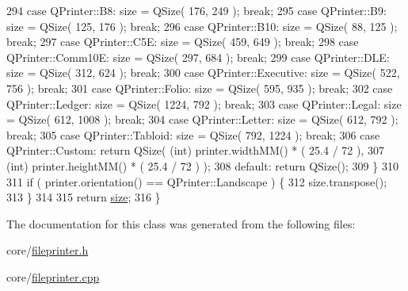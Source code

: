 \begin{DoxyCode}
294     \textcolor{keywordflow}{case} QPrinter::B8:        size = QSize(  176,  249 ); \textcolor{keywordflow}{break};
295     \textcolor{keywordflow}{case} QPrinter::B9:        size = QSize(  125,  176 ); \textcolor{keywordflow}{break};
296     \textcolor{keywordflow}{case} QPrinter::B10:       size = QSize(   88,  125 ); \textcolor{keywordflow}{break};
297     \textcolor{keywordflow}{case} QPrinter::C5E:       size = QSize(  459,  649 ); \textcolor{keywordflow}{break};
298     \textcolor{keywordflow}{case} QPrinter::Comm10E:   size = QSize(  297,  684 ); \textcolor{keywordflow}{break};
299     \textcolor{keywordflow}{case} QPrinter::DLE:       size = QSize(  312,  624 ); \textcolor{keywordflow}{break};
300     \textcolor{keywordflow}{case} QPrinter::Executive: size = QSize(  522,  756 ); \textcolor{keywordflow}{break};
301     \textcolor{keywordflow}{case} QPrinter::Folio:     size = QSize(  595,  935 ); \textcolor{keywordflow}{break};
302     \textcolor{keywordflow}{case} QPrinter::Ledger:    size = QSize( 1224,  792 ); \textcolor{keywordflow}{break};
303     \textcolor{keywordflow}{case} QPrinter::Legal:     size = QSize(  612, 1008 ); \textcolor{keywordflow}{break};
304     \textcolor{keywordflow}{case} QPrinter::Letter:    size = QSize(  612,  792 ); \textcolor{keywordflow}{break};
305     \textcolor{keywordflow}{case} QPrinter::Tabloid:   size = QSize(  792, 1224 ); \textcolor{keywordflow}{break};
306     \textcolor{keywordflow}{case} QPrinter::Custom:    \textcolor{keywordflow}{return} QSize( (\textcolor{keywordtype}{int}) printer.widthMM() * ( 25.4 / 72 ),
307                                             (\textcolor{keywordtype}{int}) printer.heightMM() * ( 25.4 / 72 ) );
308     \textcolor{keywordflow}{default}:                  \textcolor{keywordflow}{return} QSize();
309     \}
310 
311     \textcolor{keywordflow}{if} ( printer.orientation() == QPrinter::Landscape ) \{
312         size.transpose();
313     \}
314 
315     \textcolor{keywordflow}{return} \hyperlink{synctex__parser_8c_aa23c661441688350614bd6a350d2b6ff}{size};
316 \}
\end{DoxyCode}


The documentation for this class was generated from the following files\+:\begin{DoxyCompactItemize}
\item 
core/\hyperlink{fileprinter_8h}{fileprinter.\+h}\item 
core/\hyperlink{fileprinter_8cpp}{fileprinter.\+cpp}\end{DoxyCompactItemize}
